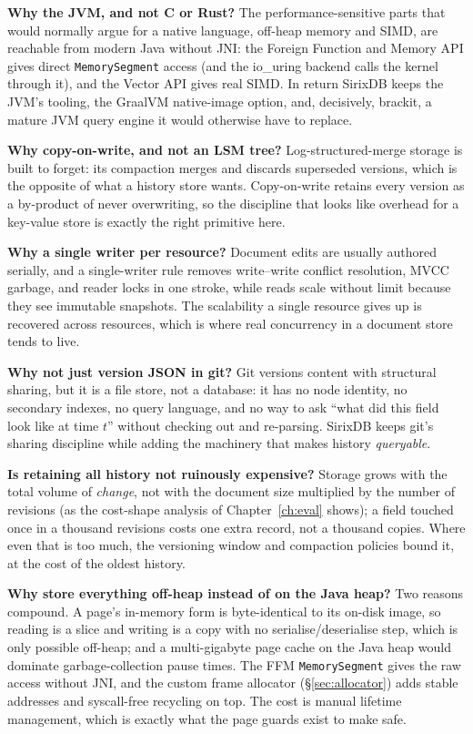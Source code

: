 \documentclass[11pt,a4paper,oneside]{report}
\theoremstyle{sirixthm}
\newcommand{\code}[1]{\texttt{#1}}
\begin{document}
\textbf{Why the JVM, and not C or Rust?} The performance-sensitive parts that would normally argue for a
native language, off-heap memory and SIMD, are reachable from modern Java without JNI: the Foreign
Function and Memory API gives direct \code{MemorySegment} access (and the io\_uring backend calls the
kernel through it), and the Vector API gives real SIMD. In return SirixDB keeps the JVM's tooling, the
GraalVM native-image option, and, decisively, brackit, a mature JVM query engine it would otherwise have
to replace.

\textbf{Why copy-on-write, and not an LSM tree?} Log-structured-merge storage is built to forget: its
compaction merges and discards superseded versions, which is the opposite of what a history store wants.
Copy-on-write retains every version as a by-product of never overwriting, so the discipline that looks
like overhead for a key-value store is exactly the right primitive here.

\textbf{Why a single writer per resource?} Document edits are usually authored serially, and a
single-writer rule removes write--write conflict resolution, MVCC garbage, and reader locks in one
stroke, while reads scale without limit because they see immutable snapshots. The scalability a single
resource gives up is recovered across resources, which is where real concurrency in a document store
tends to live.

\textbf{Why not just version JSON in git?} Git versions content with structural sharing, but it is a
file store, not a database: it has no node identity, no secondary indexes, no query language, and no way
to ask ``what did this field look like at time $t$'' without checking out and re-parsing. SirixDB keeps
git's sharing discipline while adding the machinery that makes history \emph{queryable}.

\textbf{Is retaining all history not ruinously expensive?} Storage grows with the total volume of
\emph{change}, not with the document size multiplied by the number of revisions (as the cost-shape
analysis of Chapter~\ref{ch:eval} shows); a field touched once in a thousand revisions costs one extra
record, not a thousand copies. Where even that is too much, the versioning window and compaction
policies bound it, at the cost of the oldest history.

\textbf{Why store everything off-heap instead of on the Java heap?} Two reasons compound. A page's
in-memory form is byte-identical to its on-disk image, so reading is a slice and writing is a copy with
no serialise/deserialise step, which is only possible off-heap; and a multi-gigabyte page cache on the
Java heap would dominate garbage-collection pause times. The FFM \code{MemorySegment} gives the raw
access without JNI, and the custom frame allocator (\S\ref{sec:allocator}) adds stable addresses and
syscall-free recycling on top. The cost is manual lifetime management, which is exactly what the page
guards exist to make safe.
\end{document}
